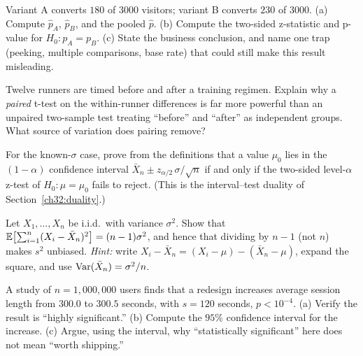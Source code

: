 \begin{exercise}
Variant A converts $180$ of $3000$ visitors; variant B converts $230$ of $3000$. (a)
Compute $\hat p_A$, $\hat p_B$, and the pooled $\hat p$. (b) Compute the two-sided
z-statistic and p-value for $H_0\!: p_A=p_B$. (c) State the business conclusion, and
name one trap (peeking, multiple comparisons, base rate) that could still make this
result misleading.
\end{exercise}

\begin{exercise}
Twelve runners are timed before and after a training regimen. Explain why a
\emph{paired} t-test on the within-runner differences is far more powerful than an
unpaired two-sample test treating ``before'' and ``after'' as independent groups. What
source of variation does pairing remove?
\end{exercise}

\begin{exercise}
For the known-$\sigma$ case, prove from the definitions that a value $\mu_0$ lies in the
$(1-\alpha)$ confidence interval $\bar X_n \pm z_{\alpha/2}\,\sigma/\sqrt n$ if and only
if the two-sided level-$\alpha$ z-test of $H_0\!:\mu=\mu_0$ fails to reject. (This is the
interval--test duality of Section~\ref{ch32:duality}.)
\end{exercise}

\begin{exercise}
Let $X_1,\dots,X_n$ be i.i.d.\ with variance $\sigma^2$. Show that
$\operatorname{\mathbb{E}}\!\left[\sum_{i=1}^n (X_i - \bar X_n)^2\right] = (n-1)\sigma^2$, and hence that
dividing by $n-1$ (not $n$) makes $s^2$ unbiased. \emph{Hint:} write $X_i - \bar X_n =
(X_i - \mu) - (\bar X_n - \mu)$, expand the square, and use $\operatorname{Var}(\bar X_n)=\sigma^2/n$.
\end{exercise}

\begin{exercise}
A study of $n=1{,}000{,}000$ users finds that a redesign increases average session length
from $300.0$ to $300.5$ seconds, with $s=120$ seconds, $p < 10^{-4}$. (a) Verify the
result is ``highly significant.'' (b) Compute the $95\%$ confidence interval for the
increase. (c) Argue, using the interval, why ``statistically significant'' here does not
mean ``worth shipping.''
\end{exercise}
